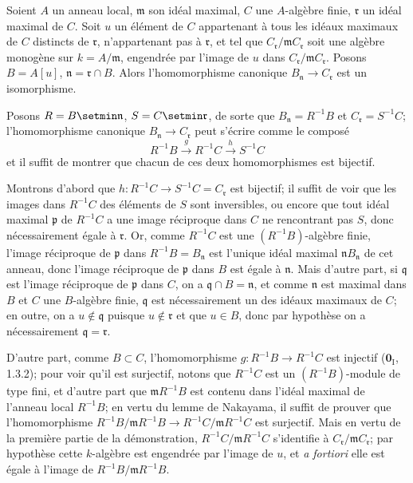 \begin{lemma}[18.4.6.1]
\label{IV.18.4.6.1}
Soient $A$ un anneau local, $\mathfrak m$ son idéal maximal, $C$ une $A$-algèbre finie, $\mathfrak r$ un idéal maximal de $C$. Soit $u$ un élément de $C$ appartenant à tous les idéaux maximaux de $C$ distincts de $\mathfrak r$, n'appartenant pas à $\mathfrak r$, et tel que $C_{\mathfrak r}/\mathfrak mC_{\mathfrak r}$ soit une algèbre monogène sur $k=A/\mathfrak m$, engendrée par l'image de $u$ dans $C_{\mathfrak r}/\mathfrak mC_{\mathfrak r}$. Posons $B=A[u]$, $\mathfrak n=\mathfrak r\cap B$. Alors l'homomorphisme canonique $B_{\mathfrak n}\to C_{\mathfrak r}$ est un isomorphisme.
\end{lemma}

Posons $R=B\setmin\mathfrak n$, $S=C\setmin\mathfrak r$, de sorte que $B_{\mathfrak n}=R^{-1}B$ et $C_{\mathfrak r}=S^{-1}C$; l'homomorphisme canonique $B_{\mathfrak n}\to C_{\mathfrak r}$ peut s'écrire comme le composé
\[
  R^{-1}B\xrightarrow{g}R^{-1}C\xrightarrow{h}S^{-1}C
\]
et il suffit de montrer que chacun de ces deux homomorphismes est bijectif.

Montrons d'abord que $h:R^{-1}C\to S^{-1}C=C_{\mathfrak r}$ est bijectif; il suffit de voir que les images dans $R^{-1}C$ des éléments de $S$ sont inversibles, ou encore que tout idéal maximal $\mathfrak p$ de $R^{-1}C$ a une image réciproque dans $C$ ne rencontrant pas $S$, donc nécessairement égale à $\mathfrak r$. Or, comme $R^{-1}C$ est une $(R^{-1}B)$-algèbre finie, l'image réciproque de $\mathfrak p$ dans
$R^{-1}B=B_{\mathfrak n}$ est l'unique idéal maximal $\mathfrak nB_{\mathfrak n}$ de cet anneau, donc l'image réciproque de $\mathfrak p$ dans $B$ est égale à $\mathfrak n$. Mais d'autre part, si $\mathfrak q$ est l'image réciproque de $\mathfrak p$ dans $C$, on a $\mathfrak q\cap B=\mathfrak n$, et comme $\mathfrak n$ est maximal dans $B$ et $C$ une $B$-algèbre finie, $\mathfrak q$ est nécessairement un des idéaux maximaux de $C$; en outre, on a $u\notin\mathfrak q$ puisque $u\notin\mathfrak r$ et que $u\in B$, donc par hypothèse on a nécessairement $\mathfrak q=\mathfrak r$.

D'autre part, comme $B\subset C$, l'homomorphisme $g:R^{-1}B\to R^{-1}C$ est injectif ($\mathbf{0}_{\mathrm I}$, 1.3.2); pour voir qu'il est surjectif, notons que $R^{-1}C$ est un $(R^{-1}B)$-module de type fini, et d'autre part que $\mathfrak mR^{-1}B$ est contenu dans l'idéal maximal de l'anneau local $R^{-1}B$; en vertu du lemme de Nakayama, il suffit de prouver que l'homomorphisme $R^{-1}B/\mathfrak mR^{-1}B\to R^{-1}C/\mathfrak mR^{-1}C$ est surjectif. Mais en vertu de la première partie de la démonstration, $R^{-1}C/\mathfrak mR^{-1}C$ s'identifie à $C_{\mathfrak r}/\mathfrak mC_{\mathfrak r}$; par hypothèse cette $k$-algèbre est engendrée par l'image de $u$, et \emph{a fortiori} elle est égale à l'image de $R^{-1}B/\mathfrak mR^{-1}B$.

